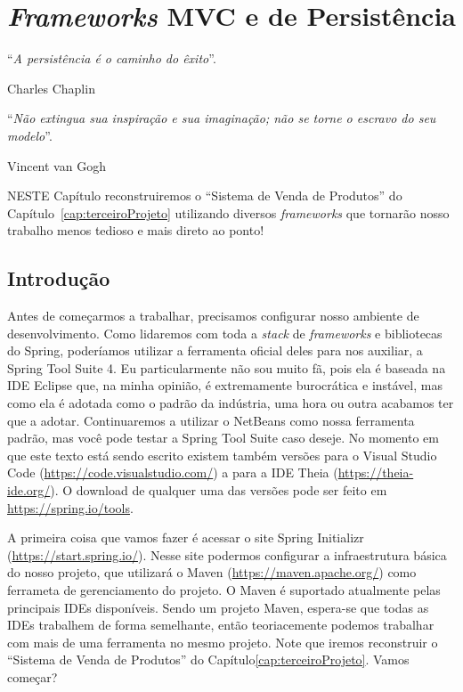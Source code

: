 \chapter{\textit{Frameworks} MVC e de Persistência}\label{cap:frameworksPersistencia}
\epigraph{``\textit{A persistência é o caminho do êxito}''.}{Charles Chaplin}
\epigraph{``\textit{Não extingua sua inspiração e sua imaginação; não se torne o escravo do seu modelo}''.}{Vincent van Gogh}

\lettrine[lines=4, lhang=0.1, lraise=0, loversize=0.2, findent=0.1em]{\textcolor{corTema}{N}}{ESTE} Capítulo reconstruiremos o ``Sistema de Venda de Produtos'' do Capítulo~\ref{cap:terceiroProjeto} utilizando diversos \textit{frameworks} que tornarão nosso trabalho menos tedioso e mais direto ao ponto!

\vfill

\section{Introdução}

Antes de começarmos a trabalhar, precisamos configurar nosso ambiente de desenvolvimento. Como lidaremos com toda a \textit{stack} de \textit{frameworks} e bibliotecas do Spring, poderíamos utilizar a ferramenta oficial deles para nos auxiliar, a Spring Tool Suite 4. Eu particularmente não sou muito fã, pois ela é baseada na IDE Eclipse que, na minha opinião, é extremamente burocrática e instável, mas como ela é adotada como o padrão da indústria, uma hora ou outra acabamos ter que a adotar. Continuaremos a utilizar o NetBeans como nossa ferramenta padrão, mas você pode testar a Spring Tool Suite caso deseje. No momento em que este texto está sendo escrito existem também versões para o Visual Studio Code (\url{https://code.visualstudio.com/}) a para a IDE Theia (\url{https://theia-ide.org/}). O download de qualquer uma das versões pode ser feito em \url{https://spring.io/tools}.

A primeira coisa que vamos fazer é acessar o site Spring Initializr (\url{https://start.spring.io/}). Nesse site podermos configurar a infraestrutura básica do nosso projeto, que utilizará o Maven (\url{https://maven.apache.org/}) como ferrameta de gerenciamento do projeto. O Maven é suportado atualmente pelas principais IDEs disponíveis. Sendo um projeto Maven, espera-se que todas as IDEs trabalhem de forma semelhante, então teoriacemente podemos trabalhar com mais de uma ferramenta no mesmo projeto. Note que iremos reconstruir o ``Sistema de Venda de Produtos'' do Capítulo\ref{cap:terceiroProjeto}. Vamos começar?

